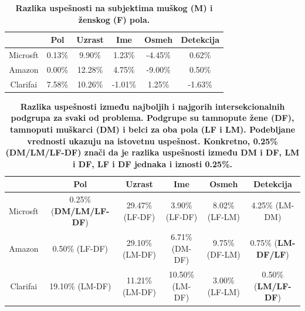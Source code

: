 \documentclass[11pt, a4paper]{article}
\begin{document}
\begin{table}[h!]
	\centering
	\caption{\textbf{Razlika uspešnosti na subjektima muškog (M) i ženskog (F) pola.}}
	\begin{tabular}{c|ccccc} \toprule
		{} & {Pol} & {Uzrast} & {Ime} & {Osmeh} & {Detekcija} \\ \midrule
		{Microsft} & 0.13\% & 9.90\% & 1.23\% & -4.45\% & 0.62\% \\ 
		{Amazon} & 0.00\% & 12.28\% & 4.75\% & -9.00\% & 0.50\% \\
		{Clarifai} & 7.58\% & 10.26\% & -1.01\% & 1.25\% & -1.63\%\\ \bottomrule
	\end{tabular}
	\label{table:unitary-gender}
\end{table}

\begin{table}[h!]
	\centering
	\caption{\textbf{Razlika uspešnosti između najboljih i najgorih intersekcionalnih podgrupa za svaki od problema. Podgrupe su tamnopute žene (DF), tamnoputi muškarci (DM) i belci za oba pola (LF i LM). Podebljane vrednosti ukazuju na istovetnu uspešnost. Konkretno, 0.25\% (DM/LM/LF-DF) znači da je razlika uspešnosti između DM i DF, LM i DF, LF i DF jednaka i iznosti 0.25\%.}}
	\begin{adjustbox}{width=\textwidth}
	\begin{tabular}{c|ccccc} \toprule
		{} & {Pol} & {Uzrast} & {Ime} & {Osmeh} & {Detekcija} \\ \midrule
		{Microsft} & 0.25\% (\textbf{DM/LM/LF-DF}) & 29.47\% (LF-DF) & 3.90\% (LF-DF) & 8.02\% (LF-LM) & 4.25\% (LM-DM) \\ 
		{Amazon} & 0.50\% (LF-DF) & 29.10\% (LM-DF) & 6.71\% (DM-DF) & 9.75\% (DF-LM) & 0.75\% (\textbf{LM-DF/LF}) \\
		{Clarifai} & 19.10\% (LM-DF) & 11.21\% (LM-DF) & 10.50\% (LM-DF) & 3.00\% (LF-LM) & 0.50\% (\textbf{LM/LF-DF}) \\ \bottomrule
	\end{tabular}
	\end{adjustbox}
	\label{table:intersectional}
\end{table}
\end{document}
